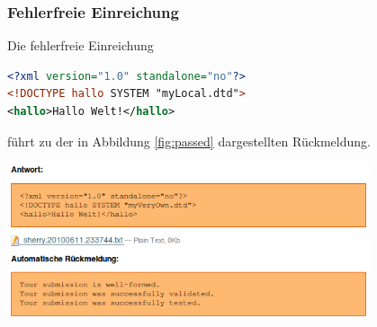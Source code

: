 \documentclass[a4paper]{scrartcl}
\begin{document}
  	  \subsubsection{Fehlerfreie Einreichung}
  	  Die fehlerfreie Einreichung
  	  \begin{lstlisting}[language=XML, captionpos=b, frame=tlRB, caption={Fehlerfreie Einreichung}]
<?xml version="1.0" standalone="no"?>
<!DOCTYPE hallo SYSTEM "myLocal.dtd">
<hallo>Hallo Welt!</hallo>
\end{lstlisting}
  	  führt zu der in Abbildung \ref{fig:passed} dargestellten Rückmeldung.
  	  \begin{center}
        \captionsetup{type=figure}
	      \includegraphics[width=0.8\textwidth]{images/passed.png}
	      \label{fig:passed}
      \end{center}
\end{document}

